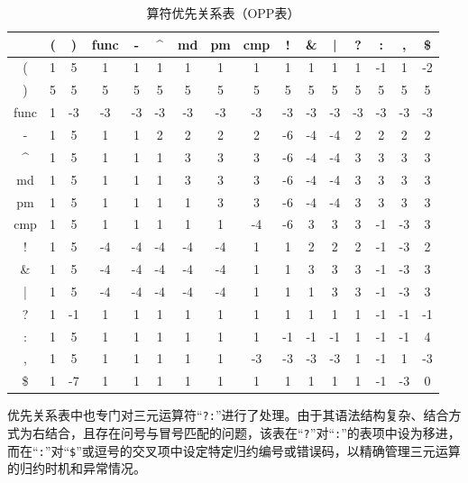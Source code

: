 \documentclass[a4paper, twoside, utf8]{ctexart}
\begin{document}
    \begin{table}[H]
        \centering
        \caption{算符优先关系表（OPP表）}
        \begin{tabular}{c|c c c c c c c c c c c c c c c}
            \toprule
             & ( & ) & func & - & \^{} & md & pm & cmp & ! & \& & | & ? & : & , & \$ \\
            \midrule
            (     & 1 & 5  & 1  & 1 & 1 & 1 & 1 & 1  & 1  & 1  & 1  & 1  & -1 & 1  & -2 \\
            )     & 5 & 5  & 5  & 5 & 5 & 5 & 5 & 5  & 5  & 5  & 5  & 5  & 5  & 5  & 5  \\
            func  & 1 & -3 & -3 & -3& -3& -3& -3& -3 & -3 & -3 & -3 & -3 & -3 & -3 & -3 \\
            -     & 1 & 5  & 1  & 1 & 2 & 2 & 2 & 2  & -6 & -4 & -4 & 2  & 2  & 2  & 2  \\
            \^{}  & 1 & 5  & 1  & 1 & 1 & 3 & 3 & 3  & -6 & -4 & -4 & 3  & 3  & 3  & 3  \\
            md    & 1 & 5  & 1  & 1 & 1 & 3 & 3 & 3  & -6 & -4 & -4 & 3  & 3  & 3  & 3  \\
            pm    & 1 & 5  & 1  & 1 & 1 & 1 & 3 & 3  & -6 & -4 & -4 & 3  & 3  & 3  & 3  \\
            cmp   & 1 & 5  & 1  & 1 & 1 & 1 & 1 & -4 & -6 & 3  & 3  & 3  & -1 & -3 & 3  \\
            !     & 1 & 5  & -4 & -4& -4& -4& -4& 1  & 1  & 2  & 2  & 2  & -1 & -3 & 2  \\
            \&    & 1 & 5  & -4 & -4& -4& -4& -4& 1  & 1  & 3  & 3  & 3  & -1 & -3 & 3  \\
            |     & 1 & 5  & -4 & -4& -4& -4& -4& 1  & 1  & 1  & 3  & 3  & -1 & -3 & 3  \\
            ?     & 1 & -1 & 1  & 1 & 1 & 1 & 1 & 1  & 1  & 1  & 1  & 1  & -1 & -1 & -1 \\
            :     & 1 & 5  & 1  & 1 & 1 & 1 & 1 & 1  & -1 & -1 & -1 & 1  & -1 & -1 & 4  \\
            ,     & 1 & 5  & 1  & 1 & 1 & 1 & 1 & -3 & -3 & -3 & -3 & 1  & -1 & 1  & -3 \\
            \$    & 1 & -7 & 1  & 1 & 1 & 1 & 1 & 1  & 1  & 1  & 1  & 1  & -1 & -3 & 0  \\
            \bottomrule
        \end{tabular}
    \end{table}
    
    优先关系表中也专门对三元运算符“\verb|?:|”进行了处理。由于其语法结构复杂、结合方式为右结合，且存在问号与冒号匹配的问题，该表在“\verb|?|”对“\verb|:|”的表项中设为移进，而在“\verb|:|”对“\verb|$|”或逗号的交叉项中设定特定归约编号或错误码，以精确管理三元运算的归约时机和异常情况。
    
\end{document}
